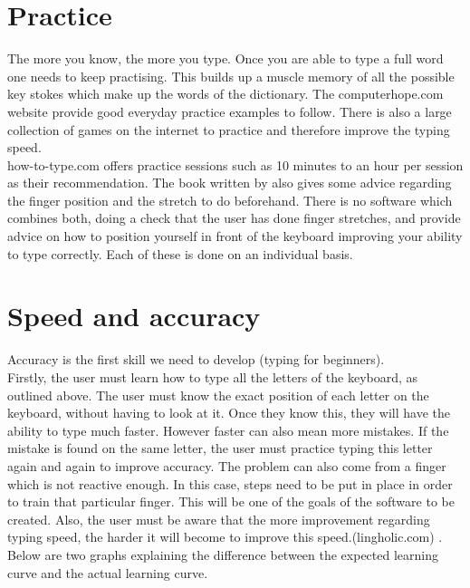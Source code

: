 \section{Practice}
The more you know, the more you type. Once you are able to type a full word one needs to keep practising. This builds up a muscle memory of all the possible key stokes which make up the words of the dictionary.
The computerhope.com\cite{computerhope} website provide good everyday practice examples to follow. There is also a large collection of games on the internet to practice and therefore improve the typing speed.\\
how-to-type.com \cite{howto} offers practice sessions such as 10 minutes to an hour per session as their recommendation.
The book written by \cite{handBook} also gives some advice regarding the finger position and the stretch to do beforehand.
There is no software which combines both, doing a check that the user has done finger stretches, and provide advice on how to position yourself in front of the keyboard improving your ability to type correctly. Each of these is done on an individual basis.

\section{Speed and accuracy}
Accuracy is the first skill we need to develop (typing for beginners)\cite{beginners}.\\
Firstly, the user must learn how to type all the letters of the keyboard, as outlined above. The user must know the exact position of each letter on the keyboard, without having to look at it. Once they know this, they will have the ability to type much faster. However faster can also mean more mistakes. If the mistake is found on the same letter, the user must practice typing this letter again and again to improve accuracy. The problem can also come from a finger which is not reactive enough. In this case, steps need to be put in place in order to train that particular finger. This will be one of the goals of the software to be created. Also, the user must be aware that the more improvement regarding typing speed, the harder it will become to improve this speed.(lingholic.com) \cite{plateau}. Below are two graphs explaining the difference between the expected learning curve and the actual learning curve.

